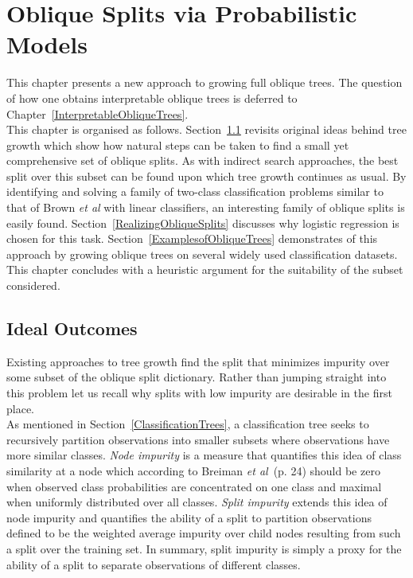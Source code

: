 \chapter{Oblique Splits via Probabilistic Models}
\label{ObliqueSplitsviaProbabilisticModels}
This chapter presents a new approach to growing full oblique trees. The question of how one obtains interpretable oblique trees is deferred to Chapter~\ref{InterpretableObliqueTrees}.\\

This chapter is organised as follows. Section~\ref{IdealOutcomes} revisits original ideas behind tree growth which show how natural steps can be taken to find a small yet comprehensive set of oblique splits. As with indirect search approaches, the best split over this subset can be found upon which tree growth continues as usual. By identifying and solving a family of two-class classification problems similar to that of Brown \emph{et al} with linear classifiers, an interesting family of oblique splits is easily found. Section~\ref{RealizingObliqueSplits} discusses why logistic regression is chosen for this task. Section~\ref{ExamplesofObliqueTrees} demonstrates of this approach by growing oblique trees on several widely used classification datasets. This chapter concludes with a heuristic argument for the suitability of the subset considered.

\section{Ideal Outcomes}
\label{IdealOutcomes}
Existing approaches to tree growth find the split that minimizes impurity over some subset of the oblique split dictionary. Rather than jumping straight into this problem let us recall why splits with low impurity are desirable in the first place. \\

As mentioned in Section~\ref{ClassificationTrees}, a classification tree seeks to recursively partition observations into smaller subsets where observations have more similar classes. \emph{Node impurity} is a measure that quantifies this idea of class similarity at a node which according to Breiman \emph{et al}~\cite{cart84-2}(p. 24) should be zero when observed class probabilities are concentrated on one class and maximal when uniformly distributed over all classes. \emph{Split impurity} extends this idea of node impurity and quantifies the ability of a split to partition observations defined to be the weighted average impurity over child nodes resulting from such a split over the training set. In summary, split impurity is simply a proxy for the ability of a split to separate observations of different classes. \\

